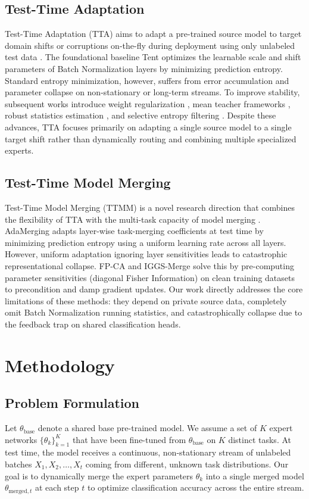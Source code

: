 \documentclass{article}
\theoremstyle{plain}
\theoremstyle{definition}
\theoremstyle{remark}
\begin{document}
\subsection{Test-Time Adaptation}
Test-Time Adaptation (TTA) aims to adapt a pre-trained source model to target domain shifts or corruptions on-the-fly during deployment using only unlabeled test data \cite{liang2023comprehensive}. The foundational baseline Tent \cite{wang2021tent} optimizes the learnable scale and shift parameters of Batch Normalization layers by minimizing prediction entropy. Standard entropy minimization, however, suffers from error accumulation and parameter collapse on non-stationary or long-term streams. To improve stability, subsequent works introduce weight regularization \cite{niu2022efficient}, mean teacher frameworks \cite{wang2022continual}, robust statistics estimation \cite{yuan2023robust}, and selective entropy filtering \cite{niu2023towards}. Despite these advances, TTA focuses primarily on adapting a single source model to a single target shift rather than dynamically routing and combining multiple specialized experts.

\subsection{Test-Time Model Merging}
Test-Time Model Merging (TTMM) is a novel research direction that combines the flexibility of TTA with the multi-task capacity of model merging \cite{yang2024adamerging, zhao2024dynamic}. AdaMerging \cite{yang2024adamerging} adapts layer-wise task-merging coefficients at test time by minimizing prediction entropy using a uniform learning rate across all layers. However, uniform adaptation ignoring layer sensitivities leads to catastrophic representational collapse. FP-CA and IGGS-Merge solve this by pre-computing parameter sensitivities (diagonal Fisher Information) on clean training datasets to precondition and damp gradient updates. Our work directly addresses the core limitations of these methods: they depend on private source data, completely omit Batch Normalization running statistics, and catastrophically collapse due to the feedback trap on shared classification heads.

\section{Methodology}
\label{submission-methodology}

\subsection{Problem Formulation}
Let $\theta_{\text{base}}$ denote a shared base pre-trained model. We assume a set of $K$ expert networks $\{\theta_k\}_{k=1}^K$ that have been fine-tuned from $\theta_{\text{base}}$ on $K$ distinct tasks. At test time, the model receives a continuous, non-stationary stream of unlabeled batches $X_1, X_2, \dots, X_t$ coming from different, unknown task distributions. Our goal is to dynamically merge the expert parameters $\theta_k$ into a single merged model $\theta_{\text{merged}, t}$ at each step $t$ to optimize classification accuracy across the entire stream.
\end{document}
